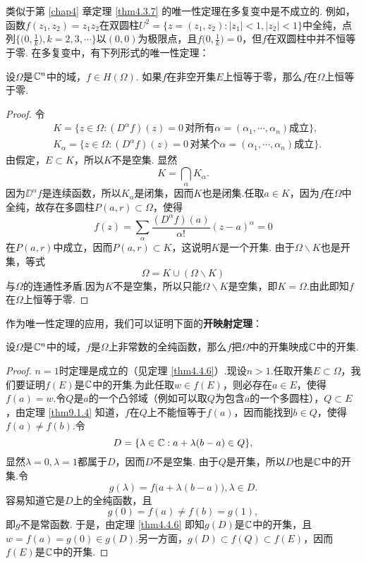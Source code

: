 类似于第 \ref{chap4} 章定理 \ref{thm4.3.7} 的唯一性定理在多复变中是不成立的. 例如，函数$f(z_1,z_2)=z_1z_2$在双圆柱$U^2=\{z=(z_1,z_2):|z_1|<1,|z_2|<1\}$中全纯，点列$\bigg\{\bigg(0,\frac1k\bigg),k=2,3,\cdots\bigg\}$以$(0,0)$为极限点，且$f\bigg(0,\frac1k\bigg)=0$，但$f$在双圆柱中并不恒等于零. 在多复变中，有下列形式的唯一性定理：
\begin{theorem}\label{thm9.1.4}
设$\Omega$是$\mathbb C^n$中的域，$f\in H(\Omega)$. 如果$f$在非空开集$E$上恒等于零，那么$f$在$\Omega$上恒等于零.
\end{theorem}
\begin{proof}
令
\begin{align*}
&K=\{z\in\Omega:(D^\alpha f)(z)=0\,\mbox{对所有$\alpha=(\alpha_1,\cdots,\alpha_n)$成立}\},\\
&K_\alpha=\{z\in\Omega:(D^\alpha f)(z)=0\,\mbox{对某个$\alpha=(\alpha_1,\cdots,\alpha_n)$成立}\}.
\end{align*}
由假定，$E\subset K$，所以$K$不是空集. 显然
\[K=\bigcap_\alpha K_\alpha.\]
因为$\DD^\alpha f$是连续函数，所以$K_\alpha$是闭集，因而$K$也是闭集.任取$a\in K$，因为$f$在$\Omega$中全纯，故存在多圆柱$P(a,r)\subset \Omega$，使得
\[f(z)=\sum_\alpha\frac{(D^\alpha f)(a)}{\alpha!}(z-a)^\alpha=0\]
在$P(a,r)$中成立，因而$P(a,r)\subset K$，这说明$K$是一个开集. 由于$\Omega\backslash K$也是开集，等式
\[\Omega=K\cup(\Omega\backslash K)\]
与$\Omega$的连通性矛盾.因为$K$不是空集，所以只能$\Omega\backslash K$是空集，即$K=\Omega$.由此即知$f$在$\Omega$上恒等于零.
\end{proof}

作为唯一性定理的应用，我们可以证明下面的\textbf{开映射定理}：
\begin{theorem}\label{thm9.1.5}
设$\Omega$是$\mathbb C^n$中的域，$f$是$\Omega$上非常数的全纯函数，那么$f$把$\Omega$中的开集映成$\mathbb C$中的开集.
\end{theorem}
\begin{proof}
$n=1$时定理是成立的（见定理 \ref{thm4.4.6}）.现设$n>1$.任取开集$E\subset\Omega$，我们要证明$f(E)$是$\mathbb C$中的开集.为此任取$w\in f(E)$，则必存在$a\in E$，使得$f(a)=w$.令$Q$是$a$的一个凸邻域（例如可以取$Q$为包含$a$的一个多圆柱），$Q\subset E$，由定理 \ref{thm9.1.4} 知道，$f$在$Q$上不能恒等于$f(a)$，因而能找到$b\in Q$，使得$f(a)\ne f(b)$.令
\[D=\{\lambda\in\mathbb C:a+\lambda(b-a)\in Q\},\]
显然$\lambda=0,\lambda=1$都属于$D$，因而$D$不是空集. 由于$Q$是开集，所以$D$也是$\mathbb C$中的开集.令
\[g(\lambda)=f\big(a+\lambda(b-a)\big),\lambda\in D.\]
容易知道它是$D$上的全纯函数，且
\[g(0)=f(a)\ne f(b)=g(1),\]
即$g$不是常函数. 于是，由定理 \ref{thm4.4.6} 即知$g(D)$是$\mathbb C$中的开集，且$w=f(a)=g(0)\in g(D)$.另一方面，$g(D)\subset f(Q)\subset f(E)$，因而$f(E)$是$\mathbb C$中的开集.
\end{proof}

